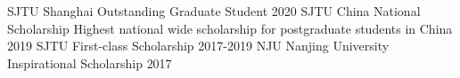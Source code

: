 \begin{cvhonors}

\cvhonor
	{SJTU} %
	{Shanghai Outstanding Graduate Student} %
	{} %
	{2020}
\cvhonor
	{SJTU} 
	{China National Scholarship}
	{{\color{red}Highest} national wide scholarship for postgraduate students in China} %
	{2019}
\cvhonor
	{SJTU} 
	{First-class Scholarship}
	{} 
	{2017-2019}
\cvhonor
	{NJU} 
	{Nanjing University Inspirational Scholarship}
	{}
	{2017}

\end{cvhonors}
